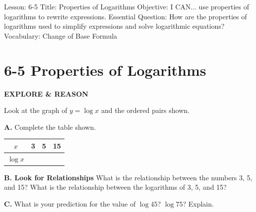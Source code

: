 \documentclass{article}
\newenvironment{lesson-meta}{}{}
\newenvironment{item-analysis}{}{}
\newenvironment{model-discuss}{}{}
\begin{document}
\begin{lesson-meta}
Lesson: 6-5
Title: Properties of Logarithms
Objective: I CAN... use properties of logarithms to rewrite expressions.
Essential Question: How are the properties of logarithms used to simplify expressions and solve logarithmic equations?
Vocabulary: Change of Base Formula
\end{lesson-meta}

\begin{item-analysis}
\end{item-analysis}

\section*{6-5 Properties of Logarithms}

\begin{model-discuss}
\textbf{EXPLORE \& REASON}

Look at the graph of $y = \log x$ and the ordered pairs shown.

\begin{center}
\end{center}

\textbf{A.} Complete the table shown.
\begin{center}
\begin{tabular}{|c|c|c|c|}
\hline
\textbf{$x$} & 3 & 5 & 15 \\ \hline
\textbf{$\log x$} & & & \\ \hline
\end{tabular}
\end{center}

\textbf{B. Look for Relationships} What is the relationship between the numbers 3, 5, and 15? What is the relationship between the logarithms of 3, 5, and 15?

\textbf{C.} What is your prediction for the value of $\log 45$? $\log 75$? Explain.
\end{model-discuss}
\end{document}
